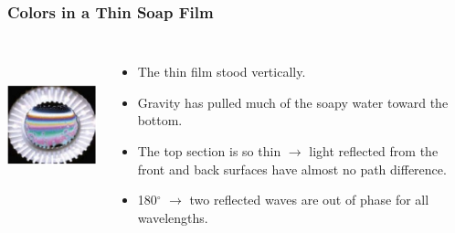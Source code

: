 \documentclass[]{beamer}
\begin{document}
\begin{frame}

\frametitle{Colors in a Thin Soap Film}




  \begin{columns}[c]
   \column{2in}  %
  
  
     \begin{center}
  \includegraphics[height=1.7in]{images5/soap3.jpg}
\end{center}


   \column{2in}

  
  \begin{itemize}
  \item The thin film  stood vertically.
  \pause
 \item  Gravity has pulled much of the soapy water toward the bottom.
 
 \pause
\item The top section is so thin $\rightarrow$ light reflected from the front and
back surfaces have almost no path difference.

\pause

\item 180$^{\circ}$ $\rightarrow$  two reflected waves are  out of phase for all wavelengths.

 
  
  \end{itemize}
  


   \end{columns}




  \end{frame}



\end{document}
